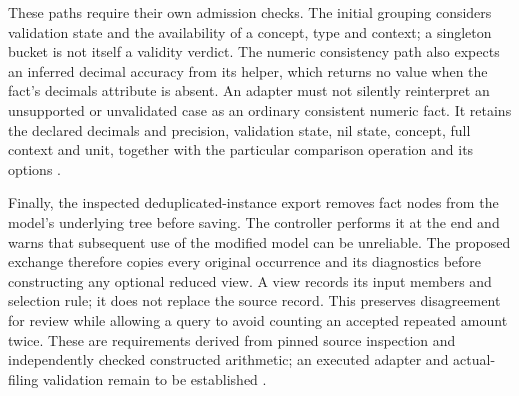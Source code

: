 These paths require their own admission checks. The initial grouping considers
validation state and the availability of a concept, type and context; a
singleton bucket is not itself a validity verdict. The numeric consistency
path also expects an inferred decimal accuracy from its helper, which returns
no value when the fact's decimals attribute is absent. An adapter must not
silently reinterpret an unsupported or unvalidated case as an ordinary
consistent numeric fact. It retains the declared decimals and precision,
validation state, nil state, concept, full context and unit, together with the
particular comparison operation and its options \citep{arellefactidentity2026}.

Finally, the inspected deduplicated-instance export removes fact nodes from
the model's underlying tree before saving. The controller performs it at the
end and warns that subsequent use of the modified model can be unreliable.
The proposed exchange therefore copies every original occurrence and its
diagnostics before constructing any optional reduced view. A view records
its input members and selection rule; it does not replace the source record.
This preserves disagreement for review while allowing a query to avoid
counting an accepted repeated amount twice. These are requirements derived
from pinned source inspection and independently checked constructed arithmetic;
an executed adapter and actual-filing validation remain to be established
\citep{arellefactidentity2026}.
